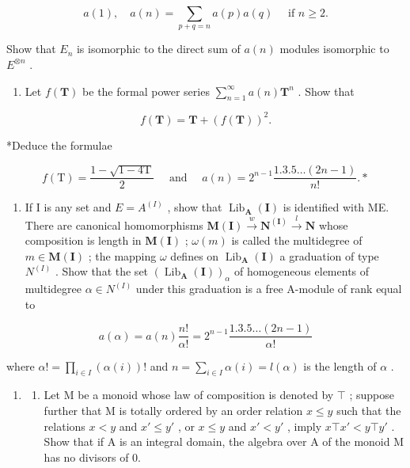 \[
a (1), \quad a (n) = \sum_ {p + q = n} a (p) a (q) \quad \text { if } n \geqslant 2.
\]

Show that \(E_{n}\) is isomorphic to the direct sum of \(a(n)\) modules isomorphic to \(E^{\otimes n}\) .

\begin{enumerate}
\def\labelenumi{(\alph{enumi})}
\setcounter{enumi}{2}
\tightlist
\item
  Let \(f(\mathbf{T})\) be the formal power series \(\sum_{n=1}^{\infty} a(n)\mathbf{T}^n\) . Show that
\end{enumerate}

\[
f (\mathbf {T}) = \mathbf {T} + (f (\mathbf {T})) ^ {2}.
\]

*Deduce the formulae

\[
f (\mathrm{T}) = \frac {1 - \sqrt {1 - 4 \mathrm{T}}}{2} \quad \text { and } \quad a (n) = 2 ^ {n - 1} \frac {1 . 3 . 5 \dots (2 n - 1)}{n !}. *
\]

\begin{enumerate}
\def\labelenumi{(\alph{enumi})}
\setcounter{enumi}{3}
\tightlist
\item
  If I is any set and \(E = A^{(I)}\) , show that \(\operatorname{Lib}_{\mathbf{A}}(\mathbf{I})\) is identified with ME. There are canonical homomorphisms \(\mathbf{M}(\mathbf{I}) \xrightarrow{w} \mathbf{N}^{(\mathbf{I})} \xrightarrow{l} \mathbf{N}\) whose composition is length in \(\mathbf{M}(\mathbf{I})\) ; \(\omega(m)\) is called the multidegree of \(m \in \mathbf{M}(\mathbf{I})\) ; the mapping \(\omega\) defines on \(\operatorname{Lib}_{\mathbf{A}}(\mathbf{I})\) a graduation of type \(N^{(I)}\) . Show that the set \((\operatorname{Lib}_{\mathbf{A}}(\mathbf{I}))_{\alpha}\) of homogeneous elements of multidegree \(\alpha \in N^{(I)}\) under this graduation is a free A-module of rank equal to
\end{enumerate}

\[
a (\alpha) = a (n) \frac {n !}{\alpha !} = 2 ^ {n - 1} \frac {1 . 3 . 5 \dots (2 n - 1)}{\alpha !}
\]

where \(\alpha! = \prod_{i \in I} (\alpha(i))!\) and \(n = \sum_{i \in I} \alpha(i) = l(\alpha)\) is the length of \(\alpha\) .

\begin{enumerate}
\def\labelenumi{\arabic{enumi}.}
\setcounter{enumi}{13}
\tightlist
\item
  \begin{enumerate}
  \def\labelenumii{(\alph{enumii})}
  \tightlist
  \item
    Let M be a monoid whose law of composition is denoted by \(\top\) ; suppose further that M is totally ordered by an order relation \(x \leqslant y\) such that the relations \(x < y\) and \(x' \leqslant y'\) , or \(x \leqslant y\) and \(x' < y'\) , imply \(x \top x' < y \top y'\) . Show that if A is an integral domain, the algebra over A of the monoid M has no divisors of 0.
  \end{enumerate}
\end{enumerate}

